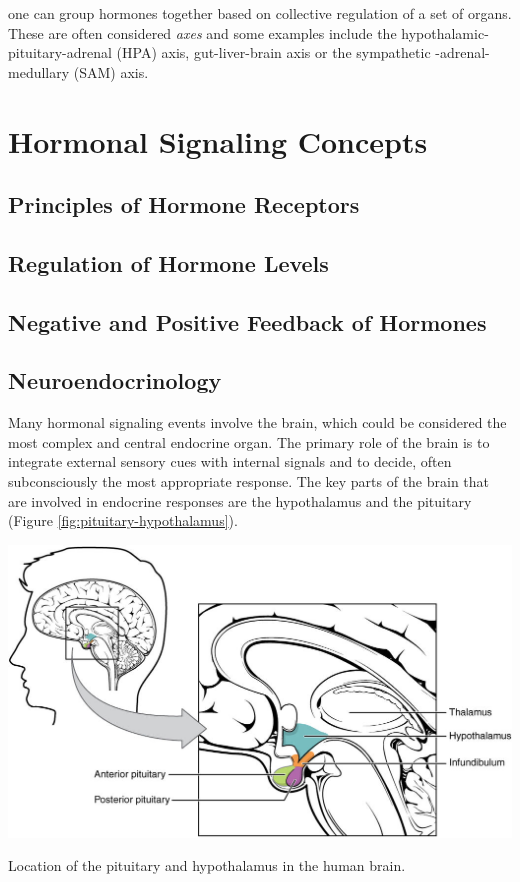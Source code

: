 \documentclass{tufte-handout}
\begin{document}
 one can group hormones together based on collective regulation  of a set of organs.  These are often considered \emph{axes} and some examples include the hypothalamic-pituitary-adrenal (HPA) axis, gut-liver-brain axis or the sympathetic -adrenal-medullary (SAM) axis. 

\section{Hormonal Signaling Concepts}
\subsection{Principles of Hormone Receptors}
\subsection{Regulation of Hormone Levels}
\subsection{Negative and Positive Feedback of Hormones}
\subsection{Neuroendocrinology}
Many hormonal signaling events involve the brain, which could be considered the most complex and central endocrine organ.  The primary role of the brain is to integrate external sensory cues with internal signals and to decide, often subconsciously the most appropriate response.  The key parts of the brain that are involved in endocrine responses are the hypothalamus and the pituitary (Figure \ref{fig:pituitary-hypothalamus}).

\begin{marginfigure}[-4in]
  \includegraphics{figures/pituitary-hypothalamus}
  \caption{Location of the pituitary and hypothalamus in the human brain.}
    \label{fig:pituitary-hypothalamus}
\end{marginfigure}
\end{document}
